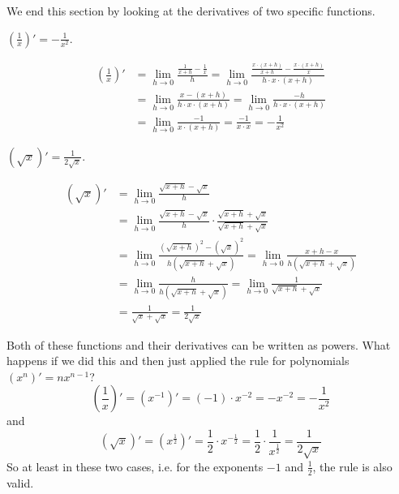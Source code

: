 \documentclass[12pt,eng]{skript_ogg}
\begin{document}
\newpage

We end this section by looking at the derivatives of two specific functions.

\begin{satz}$\left(\frac{1}{x}\right)'=-\frac{1}{x^2}$.
\end{satz}
\begin{beweis}
\begin{align*}
\left(\frac{1}{x}\right)' &= \lim_{h\rightarrow
  0}\frac{\frac{1}{x+h}-\frac{1}{x}}{h}=\lim_{h\rightarrow
  0}\frac{\frac{x\cdot(x+h)}{x+h}-\frac{x\cdot(x+h)}{x}}{h\cdot x\cdot(x+h)}\\
&=\lim_{h\rightarrow
  0}\frac{x-(x+h)}{h\cdot x\cdot(x+h)}=\lim_{h\rightarrow
  0}\frac{-h}{h\cdot x\cdot(x+h)}\\
&=\lim_{h\rightarrow
  0}\frac{-1}{x\cdot(x+h)}=\frac{-1}{x\cdot x}=-\frac{1}{x^2}
\end{align*}
\end{beweis}

\begin{satz}$\left(\sqrt{x}\right)'=\frac{1}{2\sqrt{x}}$.
\end{satz}
\begin{beweis}
\begin{align*}
\left(\sqrt{x}\right)' &= \lim_{h\rightarrow
  0}\frac{\sqrt{x+h}-\sqrt{x}}{h}\\
&= \lim_{h\rightarrow 0}\frac{\sqrt{x+h}-\sqrt{x}}{h}\cdot\frac{\sqrt{x+h}+\sqrt{x}}{\sqrt{x+h}+\sqrt{x}}\\
&= \lim_{h\rightarrow 0}\frac{(\sqrt{x+h})^2-(\sqrt{x})^2}{h(\sqrt{x+h}+\sqrt{x})}=\lim_{h\rightarrow 0}\frac{x+h-x}{h(\sqrt{x+h}+\sqrt{x})}\\
&= \lim_{h\rightarrow 0}\frac{h}{h(\sqrt{x+h}+\sqrt{x})}=\lim_{h\rightarrow 0}\frac{1}{\sqrt{x+h}+\sqrt{x}}\\
&= \frac{1}{\sqrt{x}+\sqrt{x}}=\frac{1}{2\sqrt{x}}
\end{align*}
\end{beweis}

Both of these functions and their derivatives can be written as powers. What happens if we did this and then just applied the rule for polynomials $(x^n)'=nx^{n-1}$?
\[\left(\frac{1}{x}\right)'=\left(x^{-1}\right)'=(-1)\cdot x^{-2}=-x^{-2}=-\frac{1}{x^2}\]
and
\[\left(\sqrt{x}\right)'=\left(x^{\frac{1}{2}}\right)'=\frac{1}{2}\cdot x^{-\frac{1}{2}}=\frac{1}{2}\cdot\frac{1}{x^{\frac{1}{2}}}=\frac{1}{2\sqrt{x}}\]
So at least in these two cases, i.e. for the exponents $-1$ and $\frac{1}{2}$, the rule is also valid.
\end{document}
